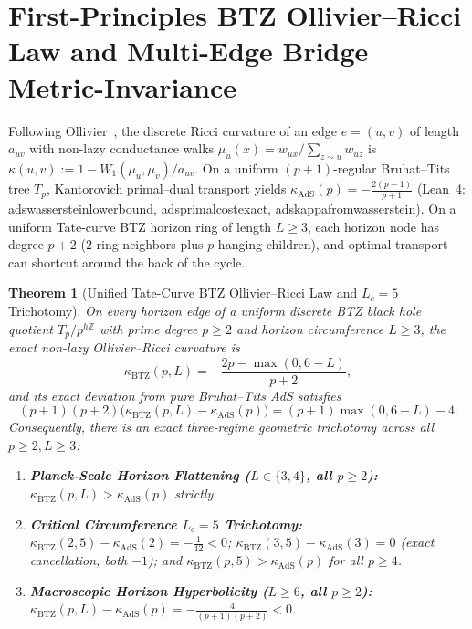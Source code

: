\documentclass[11pt,a4paper]{article}
\numberwithin{equation}{section}
\theoremstyle{plain}
\newtheorem{theorem}{Theorem}[section]
\theoremstyle{definition}
\theoremstyle{remark}
\newcommand{\Z}{\mathbb{Z}}
\newcommand{\Tp}{T_p}
\newcommand{\code}[1]{{\ttfamily\footnotesize\def\_{\textunderscore\penalty0\hskip0pt}#1}}
\begin{document}
\section[Ollivier--Ricci Curvature and Bridge Metric-Invariance]{First-Principles BTZ Ollivier--Ricci Law and Multi-Edge Bridge Metric-Invariance}
\label{sec:ricci}

Following Ollivier~\cite{Ollivier2009}, the discrete Ricci curvature of an edge $e = (u, v)$ of length $a_{uv}$ with non-lazy conductance walks $\mu_u(x) = w_{ux}/\sum_{z\sim u} w_{uz}$ is $\kappa(u,v) := 1 - W_1(\mu_u, \mu_v)/a_{uv}$. On a uniform $(p+1)$-regular Bruhat--Tits tree $\Tp$, Kantorovich primal--dual transport yields $\kappa_{\mathrm{AdS}}(p) = -\frac{2(p-1)}{p+1}$ (Lean~4: \code{ads\_wasserstein\_lower\_bound}, \code{ads\_primal\_cost\_exact}, \code{ads\_kappa\_from\_wasserstein}). On a uniform Tate-curve BTZ horizon ring of length $L \ge 3$, each horizon node has degree $p + 2$ ($2$ ring neighbors plus $p$ hanging children), and optimal transport can shortcut around the back of the cycle.

\begin{theorem}[Unified Tate-Curve BTZ Ollivier--Ricci Law and $L_c = 5$ Trichotomy]
\label{thm:btz-ricci}
On every horizon edge of a uniform discrete BTZ black hole quotient $\Tp / p^{h\Z}$ with prime degree $p \ge 2$ and horizon circumference $L \ge 3$, the exact non-lazy Ollivier--Ricci curvature is
\begin{equation}
  \kappa_{\mathrm{BTZ}}(p, L) = -\frac{2p - \max(0, 6 - L)}{p + 2},
  \label{eq:btz-ricci}
\end{equation}
and its exact deviation from pure Bruhat--Tits AdS satisfies
\begin{equation}
  (p + 1)(p + 2)\bigl(\kappa_{\mathrm{BTZ}}(p, L) - \kappa_{\mathrm{AdS}}(p)\bigr)
  = (p + 1)\max(0, 6 - L) - 4.
  \label{eq:btz-excess}
\end{equation}
Consequently, there is an exact three-regime geometric trichotomy across all $p \ge 2, L \ge 3$:
\begin{enumerate}[leftmargin=1.8em,itemsep=2pt]
  \item \textbf{Planck-Scale Horizon Flattening ($L \in \{3, 4\}$, all $p \ge 2$):} $\kappa_{\mathrm{BTZ}}(p, L) > \kappa_{\mathrm{AdS}}(p)$ strictly.
  \item \textbf{Critical Circumference $L_c = 5$ Trichotomy:} $\kappa_{\mathrm{BTZ}}(2, 5) - \kappa_{\mathrm{AdS}}(2) = -\frac{1}{12} < 0$; $\kappa_{\mathrm{BTZ}}(3, 5) - \kappa_{\mathrm{AdS}}(3) = 0$ (exact cancellation, both $-1$); and $\kappa_{\mathrm{BTZ}}(p, 5) > \kappa_{\mathrm{AdS}}(p)$ for all $p \ge 4$.
  \item \textbf{Macroscopic Horizon Hyperbolicity ($L \ge 6$, all $p \ge 2$):} $\kappa_{\mathrm{BTZ}}(p, L) - \kappa_{\mathrm{AdS}}(p) = -\frac{4}{(p+1)(p+2)} < 0$.
\end{enumerate}
\end{theorem}
\end{document}

